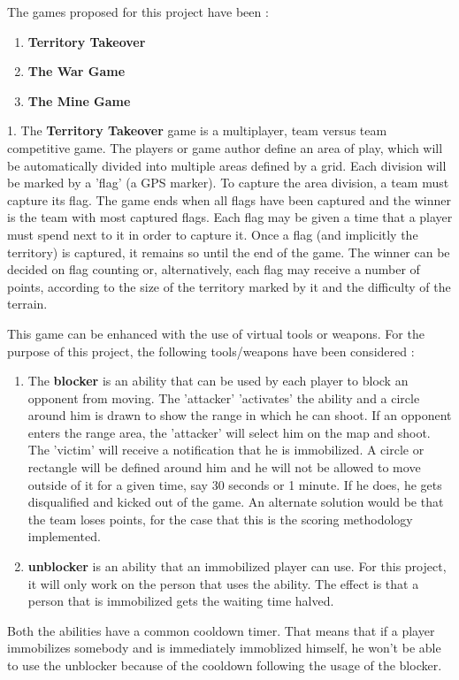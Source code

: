 The games proposed for this project have been :
\begin{enumerate}	
	\item \textbf{Territory Takeover}
	\item \textbf{The War Game}
	\item \textbf{The Mine Game}
\end{enumerate}

1. The \textbf{Territory Takeover} game is a multiplayer, team versus team
competitive game. The players or game author define an area of play, which will
be automatically divided into multiple areas defined by a grid. Each division
will be marked by a 'flag' (a GPS marker). To capture the area division, a team
must capture its flag. The game ends when all flags have been captured and the
winner is the team with most captured flags. Each flag may be given a time that
a player must spend next to it in order to capture it. Once a flag (and
implicitly the territory) is captured, it remains so until the end of the game.
The winner can be decided on flag counting or, alternatively, each flag may
receive a number of points, according to the size of the territory marked by it
and the difficulty of the terrain. \newline

This game can be enhanced with the use of virtual tools or weapons. For the
purpose of this project, the following tools/weapons have been considered :
\begin{enumerate}
	
	\item The \textbf{blocker} is an ability that can be used by each player to
	block an opponent from moving. The 'attacker' 'activates' the ability and a
	circle around him is drawn to show the range in which he can shoot. If an
	opponent enters the range area, the 'attacker' will select him on the map and
	shoot. The 'victim' will receive a notification that he is immobilized. A
	circle or rectangle will be defined around him and he will not be allowed to
	move outside of it for a given time, say 30 seconds or 1 minute. If he does, he
	gets disqualified and kicked out of the game. An alternate solution would be
	that the team loses points, for the case that this is the scoring methodology
	implemented.
	 
	\item \textbf{unblocker} is an ability that an immobilized player can use.
	For this project, it will only work on the person that uses the ability. The
	effect is that a person that is immobilized gets the waiting time halved.
	
\end{enumerate}
Both the abilities have a common cooldown timer. That means that if a player
immobilizes somebody and is immediately immoblized himself, he won't be able to
use the unblocker because of the cooldown following the usage of the
blocker.\newline

